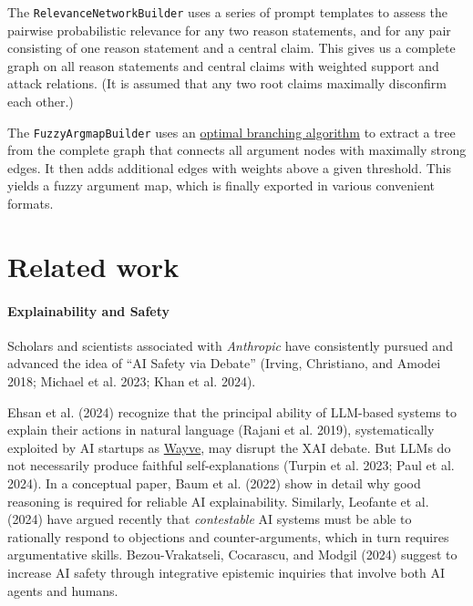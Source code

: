 \documentclass[
  letterpaper,
  DIV=11,
  numbers=noendperiod]{scrartcl}
\let\oldparagraph\paragraph
\renewcommand{\paragraph}[1]{\oldparagraph{#1}\mbox{}}
\begin{document}
The \texttt{RelevanceNetworkBuilder} uses a series of prompt templates
to assess the pairwise probabilistic relevance for any two reason
statements, and for any pair consisting of one reason statement and a
central claim. This gives us a complete graph on all reason statements
and central claims with weighted support and attack relations. (It is
assumed that any two root claims maximally disconfirm each other.)

The \texttt{FuzzyArgmapBuilder} uses an
\href{https://networkx.org/documentation/stable/reference/algorithms/generated/networkx.algorithms.tree.branchings.maximum_branching.html}{optimal
branching algorithm} to extract a tree from the complete graph that
connects all argument nodes with maximally strong edges. It then adds
additional edges with weights above a given threshold. This yields a
fuzzy argument map, which is finally exported in various convenient
formats.

\hypertarget{related-work}{%
\section{Related work}\label{related-work}}

\hypertarget{explainability-and-safety}{%
\paragraph{Explainability and Safety}\label{explainability-and-safety}}

Scholars and scientists associated with \emph{Anthropic} have
consistently pursued and advanced the idea of ``AI Safety via Debate''
(Irving, Christiano, and Amodei 2018; Michael et al. 2023; Khan et al.
2024).

Ehsan et al. (2024) recognize that the principal ability of LLM-based
systems to explain their actions in natural language (Rajani et al.
2019), systematically exploited by AI startups as
\href{https://wayve.ai/science/lingo/}{Wayve}, may disrupt the XAI
debate. But LLMs do not necessarily produce faithful self-explanations
(Turpin et al. 2023; Paul et al. 2024). In a conceptual paper, Baum et
al. (2022) show in detail why good reasoning is required for reliable AI
explainability. Similarly, Leofante et al. (2024) have argued recently
that \emph{contestable} AI systems must be able to rationally respond to
objections and counter-arguments, which in turn requires argumentative
skills. Bezou-Vrakatseli, Cocarascu, and Modgil (2024) suggest to
increase AI safety through integrative epistemic inquiries that involve
both AI agents and humans.
\end{document}
